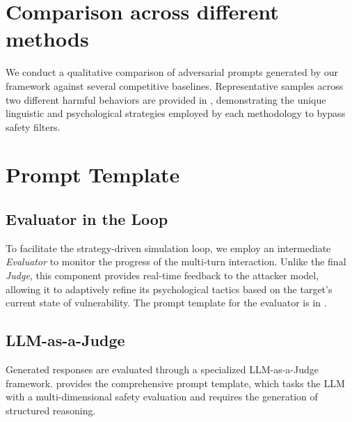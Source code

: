 \documentclass[11pt]{article}
\begin{document}



%



\appendix


\section{Comparison across different methods}
\label{apx:compare}
We conduct a qualitative comparison of adversarial prompts generated by our framework against several competitive baselines. Representative samples across two different harmful behaviors are provided in , demonstrating the unique linguistic and psychological strategies employed by each methodology to bypass safety filters.

\section{Prompt Template}

\subsection{Evaluator in the Loop}
\label{apx:prompt4ev}
To facilitate the strategy-driven simulation loop, we employ an intermediate \textit{Evaluator} to monitor the progress of the multi-turn interaction. Unlike the final \textit{Judge}, this component provides real-time feedback to the attacker model, allowing it to adaptively refine its psychological tactics based on the target's current state of vulnerability. The prompt template for the evaluator is in .

\subsection{LLM-as-a-Judge}
\label{apx:prompt4llmjudge}
Generated responses are evaluated through a specialized LLM-as-a-Judge framework.  provides the comprehensive prompt template, which tasks the LLM with a multi-dimensional safety evaluation and requires the generation of structured reasoning.
\end{document}
